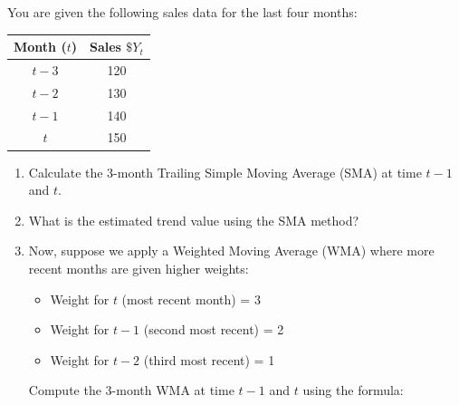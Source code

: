 \documentclass[addpoints,12pt,answers]{exam}
\begin{document}
	\vspace*{3em}
	
	
	\vspace*{3em}
	
	\begin{questions}
		
		\question You are given the following sales data for the last four months:
		
		\vspace{4mm}
		\begin{center}
			\begin{tabular}{|c|c|}
				\hline
				\textbf{Month (\( t \))} & \textbf{Sales \(\$ Y_t \)} \\
				\hline
				\( t-3 \) & 120 \\
				\( t-2 \) & 130 \\
				\( t-1 \) & 140 \\
				\( t \)   & 150 \\
				\hline
			\end{tabular}
		\end{center}
		\vspace{4mm}
		
		\begin{enumerate}[label=(\alph*)]
			\item Calculate the 3-month Trailing Simple Moving Average (SMA) at time $t-1$ and \( t \).
			\item What is the estimated trend value using the SMA method?

			\item Now, suppose we apply a Weighted Moving Average (WMA) where more recent months are given higher weights:
			\begin{itemize}
				\item Weight for \( t \) (most recent month) = 3
				\item Weight for \( t-1 \) (second most recent) = 2
				\item Weight for \( t-2 \) (third most recent) = 1
			\end{itemize}
			 Compute the 3-month WMA at time \( t-1 \) and \( t \) using the formula:
			

\end{enumerate}
\end{questions}
\end{document}
